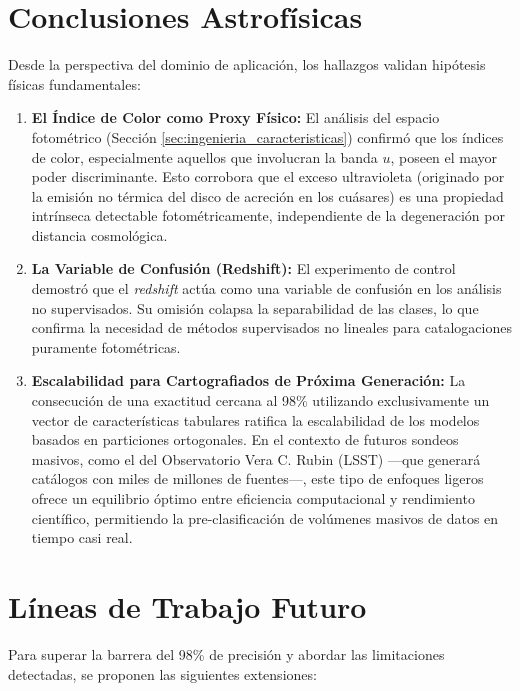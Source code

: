 \documentclass[12pt, a4paper]{report}
\begin{document}
\section{Conclusiones Astrofísicas}

Desde la perspectiva del dominio de aplicación, los hallazgos validan hipótesis físicas fundamentales:

\begin{enumerate}
    \item \textbf{El Índice de Color como Proxy Físico:} El análisis del espacio fotométrico (Sección \ref{sec:ingenieria_caracteristicas}) confirmó que los índices de color, especialmente aquellos que involucran la banda $u$, poseen el mayor poder discriminante. Esto corrobora que el exceso ultravioleta (originado por la emisión no térmica del disco de acreción en los cuásares) es una propiedad intrínseca detectable fotométricamente, independiente de la degeneración por distancia cosmológica.

    \item \textbf{La Variable de Confusión (Redshift):} El experimento de control demostró que el \textit{redshift} actúa como una variable de confusión en los análisis no supervisados. Su omisión colapsa la separabilidad de las clases, lo que confirma la necesidad de métodos supervisados no lineales para catalogaciones puramente fotométricas.

    \item \textbf{Escalabilidad para Cartografiados de Próxima Generación:} La consecución de una exactitud cercana al 98\% utilizando exclusivamente un vector de características tabulares ratifica la escalabilidad de los modelos basados en particiones ortogonales. En el contexto de futuros sondeos masivos, como el del Observatorio Vera C. Rubin (LSST) ---que generará catálogos con miles de millones de fuentes---, este tipo de enfoques ligeros ofrece un equilibrio óptimo entre eficiencia computacional y rendimiento científico, permitiendo la pre-clasificación de volúmenes masivos de datos en tiempo casi real.
\end{enumerate}

\section{Líneas de Trabajo Futuro}

Para superar la barrera del 98\% de precisión y abordar las limitaciones detectadas, se proponen las siguientes extensiones:
\end{document}
